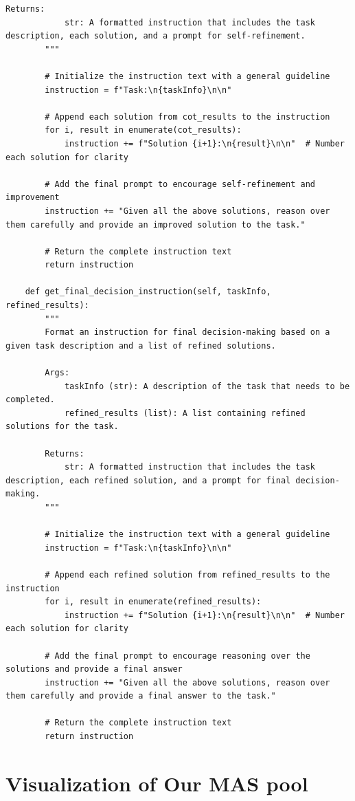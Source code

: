 \documentclass{article}
\theoremstyle{plain}
\theoremstyle{definition}
\theoremstyle{remark}
\begin{document}
\begin{lstlisting}[caption={Case 3: Multi-agent system generated by MAS-GPT. MAS-GPT can generate novel MAS.}, label={case3_mas}]
        Returns:
            str: A formatted instruction that includes the task description, each solution, and a prompt for self-refinement.
        """

        # Initialize the instruction text with a general guideline
        instruction = f"Task:\n{taskInfo}\n\n"

        # Append each solution from cot_results to the instruction
        for i, result in enumerate(cot_results):
            instruction += f"Solution {i+1}:\n{result}\n\n"  # Number each solution for clarity

        # Add the final prompt to encourage self-refinement and improvement
        instruction += "Given all the above solutions, reason over them carefully and provide an improved solution to the task."

        # Return the complete instruction text
        return instruction

    def get_final_decision_instruction(self, taskInfo, refined_results):
        """
        Format an instruction for final decision-making based on a given task description and a list of refined solutions.

        Args:
            taskInfo (str): A description of the task that needs to be completed.
            refined_results (list): A list containing refined solutions for the task.

        Returns:
            str: A formatted instruction that includes the task description, each refined solution, and a prompt for final decision-making. 
        """

        # Initialize the instruction text with a general guideline
        instruction = f"Task:\n{taskInfo}\n\n"

        # Append each refined solution from refined_results to the instruction
        for i, result in enumerate(refined_results):
            instruction += f"Solution {i+1}:\n{result}\n\n"  # Number each solution for clarity

        # Add the final prompt to encourage reasoning over the solutions and provide a final answer
        instruction += "Given all the above solutions, reason over them carefully and provide a final answer to the task."

        # Return the complete instruction text
        return instruction

\end{lstlisting}

\section{Visualization of Our MAS pool}
\end{document}
